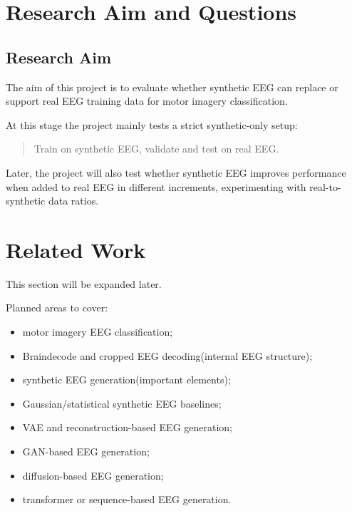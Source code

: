 \documentclass[conference]{IEEEtran}
\begin{document}
\vspace{1em}

\section{Research Aim and Questions}

\subsection{Research Aim}

The aim of this project is to evaluate whether synthetic EEG can replace or support real EEG training data for motor imagery classification.

\vspace{0.5em}

At this stage the project mainly tests a strict synthetic-only setup:

\begin{quote}
Train on synthetic EEG, validate and test on real EEG.
\end{quote}

Later, the project will also test whether synthetic EEG improves performance when added to real EEG in different increments, experimenting with real-to-synthetic data ratios.


\vspace{1em}

\section{Related Work}

This section will be expanded later.

\vspace{0.5em}

Planned areas to cover:

\begin{itemize}
\item motor imagery EEG classification;
\item Braindecode and cropped EEG decoding(internal EEG structure);
\item synthetic EEG generation(important elements);
\item Gaussian/statistical synthetic EEG baselines;
\item VAE and reconstruction-based EEG generation;
\item GAN-based EEG generation;
\item diffusion-based EEG generation;
\item transformer or sequence-based EEG generation.
\end{itemize}
\end{document}
